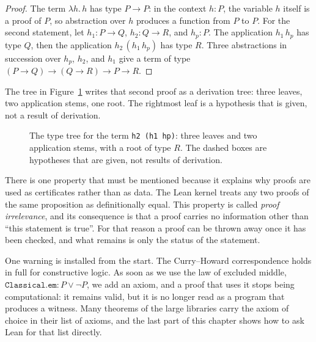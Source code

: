 \begin{proof}
The term $\lambda h.\,h$ has type $P\to P$: in the context $h:P$, the variable $h$ itself is a
proof of $P$, so abstraction over $h$ produces a function from $P$ to $P$. For the second statement,
let $h_{1}:P\to Q$, $h_{2}:Q\to R$, and $h_{p}:P$. The application $h_{1}\,h_{p}$ has type $Q$, then
the application $h_{2}\,(h_{1}\,h_{p})$ has type $R$. Three abstractions in succession over $h_{p}$,
$h_{2}$, and $h_{1}$ give a term of type $(P\to Q)\to(Q\to R)\to P\to R$.
\end{proof}

The tree in Figure~\ref{fig:pohon-tipe} writes that second proof as a derivation tree: three leaves,
two application stems, one root. The rightmost leaf is a hypothesis that is given, not a result of
derivation.

\begin{figure}[htbp]
\centering
{}
\caption{The type tree for the term \texttt{h2 (h1 hp)}: three leaves and two application stems, with
a root of type $R$. The dashed boxes are hypotheses that are given, not results of derivation.}
\label{fig:pohon-tipe}
\end{figure}

There is one property that must be mentioned because it explains why proofs are used as
certificates rather than as data. The Lean kernel treats any two proofs of the same proposition as
definitionally equal. This property is called \emph{proof irrelevance}, and its consequence is that
a proof carries no information other than ``this statement is true''. For that reason a proof can be
thrown away once it has been checked, and what remains is only the status of the statement.

One warning is installed from the start. The Curry--Howard correspondence holds in full for
constructive logic. As soon as we use the law of excluded middle, $\mathtt{Classical.em}:P\vee\neg
P$, we add an axiom, and a proof that uses it stops being computational: it remains valid, but it is
no longer read as a program that produces a witness. Many theorems of the large libraries carry the
axiom of choice in their list of axioms, and the last part of this chapter shows how to ask Lean for
that list directly.

